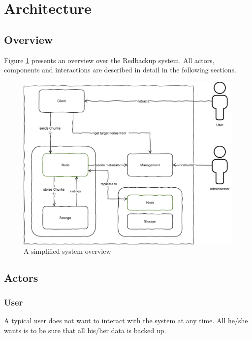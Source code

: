 
\section{Architecture}\label{sec:specification}

\subsection{Overview}
Figure \ref{fig:architecture-overview} presents an overview over the Redbackup \gls{system}. All actors, components and interactions are described in detail in the following sections.

\begin{figure}[h]
    \centering
    \includegraphics[width=1\linewidth]{resources/architecture_overview}
    \caption{A simplified \gls{system} overview}
    \label{fig:architecture-overview}
\end{figure}

\subsection{Actors}

\subsubsection{User}
A typical \gls{user} does not want to interact with the \gls{system} at any time. All he/she wants is to be sure that all his/her data is backed up.

